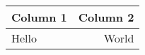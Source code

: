 \begin{tabular}{lr}
    \toprule
    \multicolumn{1}{c}{Column 1} & \multicolumn{1}{c}{Column 2} \\ 
    \midrule
    Hello & World \\
    \bottomrule
\end{tabular}